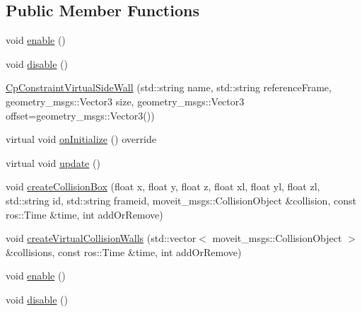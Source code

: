 \subsection*{Public Member Functions}
\begin{DoxyCompactItemize}
\item 
void \hyperlink{classsm__moveit__wine__serve_1_1cl__move__group__interface_1_1CpConstraintVirtualSideWall_a01cda66eb871a0cf5e24f84d9a06a343}{enable} ()
\item 
void \hyperlink{classsm__moveit__wine__serve_1_1cl__move__group__interface_1_1CpConstraintVirtualSideWall_a5187769bfe1dfd66e8c4ca0fe5ce614d}{disable} ()
\item 
\hyperlink{classsm__moveit__wine__serve_1_1cl__move__group__interface_1_1CpConstraintVirtualSideWall_a3a360da5959b2be141030456edfa461e}{Cp\+Constraint\+Virtual\+Side\+Wall} (std\+::string name, std\+::string reference\+Frame, geometry\+\_\+msgs\+::\+Vector3 size, geometry\+\_\+msgs\+::\+Vector3 offset=geometry\+\_\+msgs\+::\+Vector3())
\item 
virtual void \hyperlink{classsm__moveit__wine__serve_1_1cl__move__group__interface_1_1CpConstraintVirtualSideWall_a834e3d1e6b683cbacfaafc40847df9fa}{on\+Initialize} () override
\item 
virtual void \hyperlink{classsm__moveit__wine__serve_1_1cl__move__group__interface_1_1CpConstraintVirtualSideWall_a455681238d7baaaa5aa0f1e625864f3a}{update} ()
\item 
void \hyperlink{classsm__moveit__wine__serve_1_1cl__move__group__interface_1_1CpConstraintVirtualSideWall_a52617a140c7a19b4f0a08804c3a8d3a6}{create\+Collision\+Box} (float x, float y, float z, float xl, float yl, float zl, std\+::string id, std\+::string frameid, moveit\+\_\+msgs\+::\+Collision\+Object \&collision, const ros\+::\+Time \&time, int add\+Or\+Remove)
\item 
void \hyperlink{classsm__moveit__wine__serve_1_1cl__move__group__interface_1_1CpConstraintVirtualSideWall_a98576104cf4c349341031848477b2d5b}{create\+Virtual\+Collision\+Walls} (std\+::vector$<$ moveit\+\_\+msgs\+::\+Collision\+Object $>$ \&collisions, const ros\+::\+Time \&time, int add\+Or\+Remove)
\item 
void \hyperlink{classsm__moveit__wine__serve_1_1cl__move__group__interface_1_1CpConstraintVirtualSideWall_a01cda66eb871a0cf5e24f84d9a06a343}{enable} ()
\item 
void \hyperlink{classsm__moveit__wine__serve_1_1cl__move__group__interface_1_1CpConstraintVirtualSideWall_a5187769bfe1dfd66e8c4ca0fe5ce614d}{disable} ()

\end{DoxyCompactItemize}
